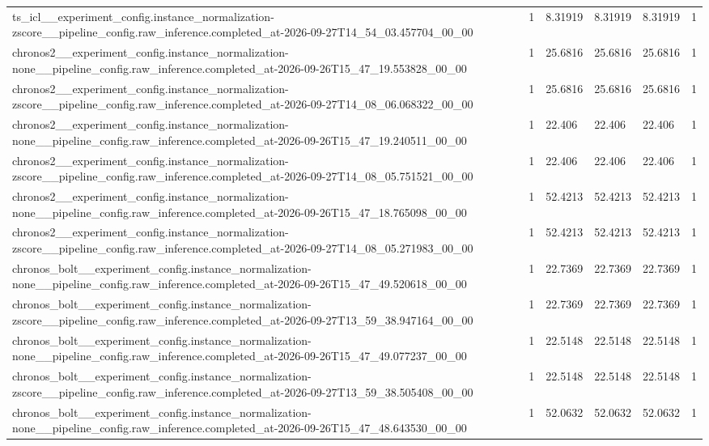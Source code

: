 \begin{tabular}{llllll}
ts\_icl\_\_experiment\_config.instance\_normalization-zscore\_\_pipeline\_config.raw\_inference.completed\_at-2026-09-27T14\_54\_03.457704\_00\_00 & 1 & 8.31919 & 8.31919 & 8.31919 & 1 \\
chronos2\_\_experiment\_config.instance\_normalization-none\_\_pipeline\_config.raw\_inference.completed\_at-2026-09-26T15\_47\_19.553828\_00\_00 & 1 & 25.6816 & 25.6816 & 25.6816 & 1 \\
chronos2\_\_experiment\_config.instance\_normalization-zscore\_\_pipeline\_config.raw\_inference.completed\_at-2026-09-27T14\_08\_06.068322\_00\_00 & 1 & 25.6816 & 25.6816 & 25.6816 & 1 \\
chronos2\_\_experiment\_config.instance\_normalization-none\_\_pipeline\_config.raw\_inference.completed\_at-2026-09-26T15\_47\_19.240511\_00\_00 & 1 & 22.406 & 22.406 & 22.406 & 1 \\
chronos2\_\_experiment\_config.instance\_normalization-zscore\_\_pipeline\_config.raw\_inference.completed\_at-2026-09-27T14\_08\_05.751521\_00\_00 & 1 & 22.406 & 22.406 & 22.406 & 1 \\
chronos2\_\_experiment\_config.instance\_normalization-none\_\_pipeline\_config.raw\_inference.completed\_at-2026-09-26T15\_47\_18.765098\_00\_00 & 1 & 52.4213 & 52.4213 & 52.4213 & 1 \\
chronos2\_\_experiment\_config.instance\_normalization-zscore\_\_pipeline\_config.raw\_inference.completed\_at-2026-09-27T14\_08\_05.271983\_00\_00 & 1 & 52.4213 & 52.4213 & 52.4213 & 1 \\
chronos\_bolt\_\_experiment\_config.instance\_normalization-none\_\_pipeline\_config.raw\_inference.completed\_at-2026-09-26T15\_47\_49.520618\_00\_00 & 1 & 22.7369 & 22.7369 & 22.7369 & 1 \\
chronos\_bolt\_\_experiment\_config.instance\_normalization-zscore\_\_pipeline\_config.raw\_inference.completed\_at-2026-09-27T13\_59\_38.947164\_00\_00 & 1 & 22.7369 & 22.7369 & 22.7369 & 1 \\
chronos\_bolt\_\_experiment\_config.instance\_normalization-none\_\_pipeline\_config.raw\_inference.completed\_at-2026-09-26T15\_47\_49.077237\_00\_00 & 1 & 22.5148 & 22.5148 & 22.5148 & 1 \\
chronos\_bolt\_\_experiment\_config.instance\_normalization-zscore\_\_pipeline\_config.raw\_inference.completed\_at-2026-09-27T13\_59\_38.505408\_00\_00 & 1 & 22.5148 & 22.5148 & 22.5148 & 1 \\
chronos\_bolt\_\_experiment\_config.instance\_normalization-none\_\_pipeline\_config.raw\_inference.completed\_at-2026-09-26T15\_47\_48.643530\_00\_00 & 1 & 52.0632 & 52.0632 & 52.0632 & 1 \\

\end{tabular}
